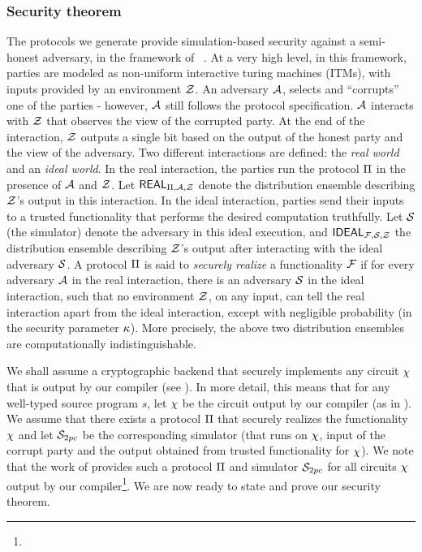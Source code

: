 
\subsubsection*{Security theorem} The protocols we generate provide
simulation-based security against a semi-honest adversary, in the
framework of ~\cite{gmw,can00,can01}. At a very high level, in this
framework, parties are modeled as non-uniform interactive turing
machines (ITMs), with inputs provided by an environment $\mathcal{Z}$. An
adversary $\mathcal{A}$, selects and ``corrupts'' one of the parties -
however, $\mathcal{A}$ still follows the protocol specification. $\mathcal{A}$
interacts with $\mathcal{Z}$ that observes the view of the corrupted
party. At the end of the interaction, $\mathcal{Z}$ outputs a single bit based on the output of the honest party and the view of the adversary. Two
different interactions are defined: the {\em real world} and an {\em
  ideal world}. In the real interaction, the parties run the protocol
$\Pi$ in the presence of $\mathcal{A}$ and $\mathcal{Z}$. Let
$\mathsf{REAL}_{\Pi,\mathcal{A},\mathcal{Z}}$ denote the  distribution ensemble
describing $\mathcal{Z}$'s output in this interaction. 
In the ideal interaction, parties send their inputs to  a
trusted functionality that performs the desired
computation truthfully. Let $\mathcal{S}$ (the simulator) denote the
adversary in this ideal execution, and $\mathsf{IDEAL}_{\mathcal{F},\mathcal{S},\mathcal{Z}}$
the distribution ensemble describing $\mathcal{Z}$'s output after
interacting with the ideal adversary $\mathcal{S}$. A
protocol $\Pi$ is said to {\em securely realize} a functionality
$\mathcal{F}$ if for every adversary $\mathcal{A}$ in the real interaction, there is
an adversary $\mathcal{S}$ in the ideal interaction, such that no
environment $\mathcal{Z}$, on any input, can tell the real interaction apart
from the ideal interaction, except with negligible probability (in the
security parameter $\kappa$). More precisely, the above two
distribution ensembles  are computationally indistinguishable. 

We shall assume a cryptographic \mpc backend that securely implements any circuit $\chi$ that is output by our compiler (see ). In more detail, this means that for any well-typed source program $s$, let $\chi$ be the circuit output by our compiler (as in ). We assume that there exists a \mpc protocol $\Pi$ that securely realizes the functionality $\chi$ and let $\simu_{\tiny{2pc}}$ be the corresponding simulator  (that runs on $\chi$, input of the corrupt party and the output obtained from trusted functionality for $\chi$). We note that the work of \cite{aby} provides such a protocol $\Pi$ and simulator $\simu_{\tiny{2pc}}$ for all circuits $\chi$ output by our compiler\footnote{}. We are now ready to state and prove our security theorem.
 
